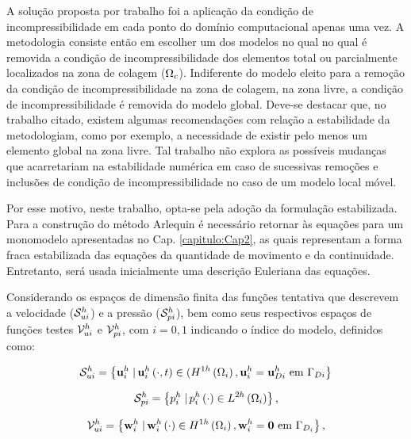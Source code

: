 A solução proposta por  trabalho foi a aplicação da condição de incompressibilidade em cada ponto do domínio computacional apenas uma vez. A metodologia consiste então em escolher um dos modelos no qual no qual é removida a condição de incompressibilidade dos elementos total ou parcialmente localizados na zona de colagem ($\Omega_c$). Indiferente do modelo eleito para a remoção da condição de incompressibilidade na zona de colagem, na zona livre, a condição de incompressibilidade é removida do modelo global. Deve-se destacar que, no trabalho citado, existem algumas recomendações com relação a estabilidade da metodologiam, como por exemplo, a necessidade de existir pelo menos um elemento global na zona livre. Tal trabalho não explora as possíveis mudanças que acarretariam na estabilidade numérica em caso de sucessivas remoções e inclusões de condição de incompressibilidade no caso de um modelo local móvel.

Por esse motivo, neste trabalho, opta-se pela adoção da formulação estabilizada.
Para a construção do método Arlequin é necessário retornar às equações para um monomodelo apresentadas no Cap. \ref{capitulo:Cap2}, as quais representam a forma fraca estabilizada das equações da quantidade de movimento e da continuidade. Entretanto, será usada inicialmente uma descrição Euleriana das equações.

Considerando os espaços de dimensão finita das funções tentativa que descrevem a velocidade ($\mathcal{S}_{ui}^h$) e a pressão ($\mathcal{S}_{pi}^h$), bem como seus respectivos espaços de funções testes $\mathcal{V}_{ui}^h$ e $\mathcal{V}_{pi}^h$, com $i = 0,1$ indicando o índice do modelo, definidos como:

\begin{align}
	\mathcal{S}_{ui}^h = \left\{\mathbf{u}_{i}^{h} \left . \right| \mathbf{u}_{i}^{h} \left(\cdot,t\right) \in (H^{1h}\left(\Omega_i\right), \mathbf{u}_{i}^{h} = \mathbf{u}_{Di}^{h} \textrm { em}  \ \Gamma_{Di} \right\}
\end{align}

\begin{align}
	\mathcal{S}_{pi}^h = \left\{p_{i}^{h} \left . \right| p_{i}^{h} \left(\cdot\right) \in L^{2h}\left(\Omega_i\right) \right\},
\end{align}

\begin{align}
	\mathcal{V}_{ui}^h = \left\{\mathbf{w}_{i}^{h} \left . \right| \mathbf{w}_{i}^{h} \left(\cdot\right) \in H^{1h}\left(\Omega_i\right), \mathbf{w}_{i}^{h} = \mathbf{0}  \textrm { em} \ \Gamma_{D_i} \right\},
\end{align}

